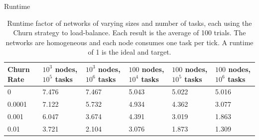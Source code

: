 \documentclass[11pt]{beamer}
\begin{document}
\begin{frame}{Runtime}
	\begin{table}[h]
		\tiny
		\centering
		\caption[Churn Runtimes in a homogenious network]{Runtime factor of networks of varying sizes and number of tasks, each using the Churn strategy to load-balance.  Each result is the average of 100 trials. The networks are homogeneous and each node consumes one task per tick.  A runtime of 1 is the ideal and target.}
		\begin{tabular}{|p{1cm} || p{1cm} | p{1cm} | p{1cm} | p{1cm} | p{1cm} |}
			\hline
			Churn Rate & $ 10^{3}$ nodes, $ 10^{5}$ tasks & $ 10^{3}$ nodes, $ 10^{6}$ tasks & $ 100$ nodes, $ 10^{4}$ tasks & $ 100$ nodes, $ 10^{5}$ tasks &$ 100$ nodes, $ 10^{6}$ tasks \\ \hline
			0      & 7.476   &  7.467 &  5.043& 5.022 &5.016 \\\hline
			0.0001 & 7.122   &  5.732 &  4.934& 4.362&3.077 \\\hline
			0.001  & 6.047   &  3.674 &  4.391& 3.019  &1.863\\\hline
			0.01  &  3.721   &  2.104 &  3.076& 1.873 &1.309\\\hline
			
		\end{tabular}
		\label{tab:ChurnRuntimesHomogenious}
	\end{table}
\end{frame}

\end{document}

